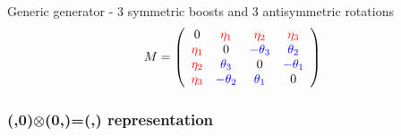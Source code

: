 \documentclass[../main.tex]{subfiles}
\begin{document}
\begin{itemize}
Generic generator - 3 symmetric boosts and 3 antisymmetric rotations
\begin{align}
M=\left(
\begin{array}{cccc}
0      &  \textcolor{red}{\eta_1} & \textcolor{red}{\eta_2} &  \textcolor{red}{\eta_3}\\
\textcolor{red}{\eta_1} &  0   & \textcolor{blue}{-\theta_3} &  \textcolor{blue}{\theta_2}\\
\textcolor{red}{\eta_2} &  \textcolor{blue}{\theta_3} &  0   & \textcolor{blue}{-\theta_1}\\
\textcolor{red}{\eta_3} & \textcolor{blue}{-\theta_2} &  \textcolor{blue}{\theta_1} &  0
\end{array}
\right)
\end{align}

\subsubsection{(,0)$\otimes$(0,)=(,) representation}



\end{itemize}
\end{document}
